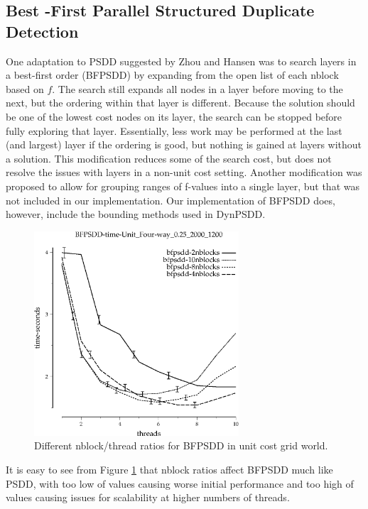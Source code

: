 \documentclass{article}
\begin{document}
\subsection{Best -First Parallel Structured Duplicate Detection}
One adaptation to PSDD \cite{zhou:sdd} suggested by Zhou and Hansen was to search layers in a best-first order (BFPSDD) by expanding from the open list of each nblock based on $f$. The search still expands all nodes in a layer before moving to the next, but the ordering within that layer is different. Because the solution should be one of the lowest cost nodes on its layer, the search can be stopped before fully exploring that layer. Essentially, less work may be performed at the last (and largest) layer if the ordering is good, but nothing is gained at layers without a solution. This modification reduces some of the search cost, but does not resolve the issues with layers in a non-unit cost setting. Another modification was proposed to allow for grouping ranges of f-values into a single layer, but that was not included in our implementation. Our implementation of BFPSDD does, however, include the bounding methods used in DynPSDD.

\begin{figure}[h!]
\includegraphics[width=3in]{../graphs/grid_unit_four-way_0.25_2000_1200/BFPSDD-time-Unit_Four-way_0.25_2000_1200.eps}
\caption{Different nblock/thread ratios for BFPSDD in unit cost grid world.}
\label{fig:BFPSDD-nblock-grid}
\end{figure}

It is easy to see from Figure \ref{fig:BFPSDD-nblock-grid} that nblock ratios affect BFPSDD much like PSDD, with too low of values causing worse initial performance and too high of values causing issues for scalability at higher numbers of threads.
\end{document}
